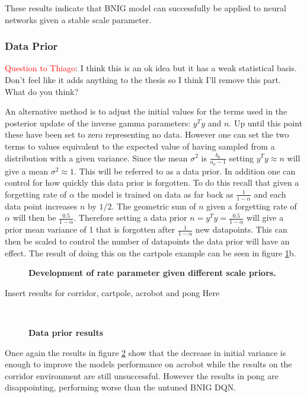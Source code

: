 These results indicate that BNIG model can successfully be applied to neural networks given a stable scale parameter.

\subsubsection{Data Prior}

\textcolor{red}{Question to Thiago}: I think this is an ok idea but it has a weak statistical basis. Don't feel like it adds anything to the thesis so I think I'll remove this part. What do you think?

An alternative method is to adjust the initial values for the terms used in the posterior update of the inverse gamma parameters: $y^Ty$ and $n$. Up until this point these have been set to zero representing no data. However one can set the two terms to values equivalent to the expected value of having sampled from a distribution with a given variance. Since the mean $\sigma^2$ is $\frac{b_a}{a_a-1}$ setting $y^Ty\approx n$ will give a mean $\sigma^2\approx 1$. This will be referred to as a data prior. In addition one can control for how quickly this data prior is forgotten. To do this recall that given a forgetting rate of $\alpha$ the model is trained on data as far back as $\frac{1}{1-\alpha}$ and each data point increases $n$ by $1/2$. The geometric sum of $n$ given a forgetting rate of $\alpha$ will then be $\frac{0.5}{1-\alpha}$. Therefore setting a data prior $n=y^Ty=\frac{0.5}{1-\alpha}$ will give a prior mean variance of 1 that is forgotten after $\frac{1}{1-\alpha}$ new datapoints. This can then be scaled to control the number of datapoints the data prior will have an effect. The result of doing this on the cartpole example can be seen in figure \ref{fig:scale_stability2}b.

\begin{figure}[H]
    \centering
    \caption{\textbf{Development of rate parameter given different scale priors.}}
    \label{fig:scale_stability2}
\end{figure}

\todo Insert results for corridor, cartpole, acrobot and pong Here

\begin{figure}[H] 
    \centering 
    \\
    \caption{\textbf{Data prior results}} 
    \label{fig:relative_scale} 
\end{figure}

Once again the results in figure \ref{fig:relative_scale} show that the decrease in initial variance is enough to improve the models performance on acrobot while the results on the corridor environment are still unsuccessful. However the results in pong are disappointing, performing worse than the untuned BNIG DQN.

\cleardoublepage